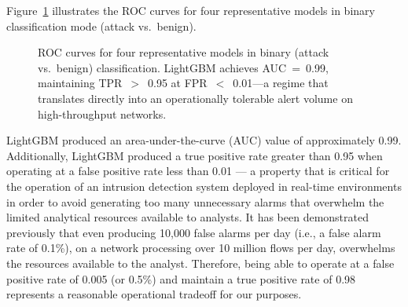 Figure~\ref{fig:roc} illustrates the ROC curves for four representative models in binary classification mode (attack vs.\ benign).

\begin{figure}[H]
\centering
{}
\caption{ROC curves for four representative models in binary (attack vs.\ benign) classification. LightGBM achieves AUC~=~0.99, maintaining TPR~$>$~0.95 at FPR~$<$~0.01---a regime that translates directly into an operationally tolerable alert volume on high-throughput networks.}
\label{fig:roc}
\end{figure}

LightGBM produced an area-under-the-curve (AUC) value of approximately 0.99. Additionally, LightGBM produced a true positive rate greater than 0.95 when operating at a false positive rate less than 0.01 --- a property that is critical for the operation of an intrusion detection system deployed in real-time environments in order to avoid generating too many unnecessary alarms that overwhelm the limited analytical resources available to analysts. It has been demonstrated previously that even producing 10{,}000 false alarms per day (i.e., a false alarm rate of 0.1\%), on a network processing over 10 million flows per day, overwhelms the resources available to the analyst. Therefore, being able to operate at a false positive rate of 0.005 (or 0.5\%) and maintain a true positive rate of 0.98 represents a reasonable operational tradeoff for our purposes.

